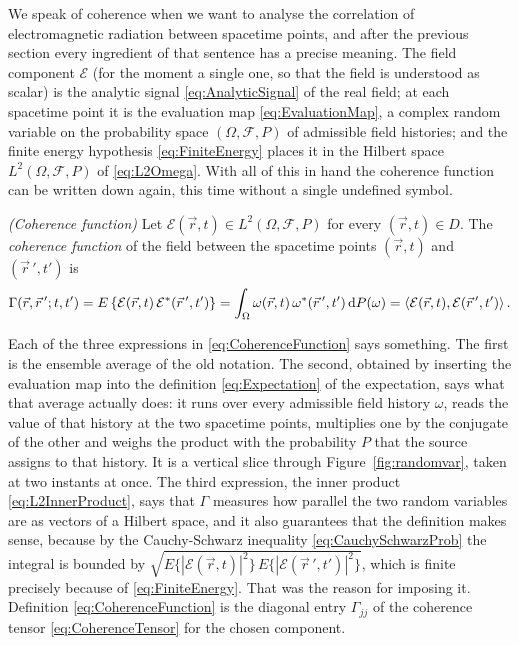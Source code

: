 	We speak of coherence when we want to analyse the correlation of electromagnetic radiation
	between spacetime points, and after the previous section every ingredient of that
	sentence has a precise meaning. The field component $\mathcal{E}$ (for the moment a
	single one, so that the field is understood as scalar) is the analytic signal
	\eqref{eq:AnalyticSignal} of the real field; at each spacetime point it is the evaluation
	map \eqref{eq:EvaluationMap}, a complex random variable on the probability space
	$(\Omega,\mathcal{F},P)$ of admissible field histories; and the finite energy hypothesis
	\eqref{eq:FiniteEnergy} places it in the Hilbert space $L^{2}(\Omega,\mathcal{F},P)$ of
	\eqref{eq:L2Omega}. With all of this in hand the coherence function can be written down
	again, this time without a single undefined symbol.

	\begin{myDef}
		\textit{(Coherence function)} Let $\mathcal{E}(\vec{r},t)\in L^{2}(\Omega,\mathcal{F},P)$
		for every $(\vec{r},t)\in D$. The \emph{coherence function} of the field between the
		spacetime points $(\vec{r},t)$ and $(\vec{r}\,',t')$ is
		\begin{equation}\label{eq:CoherenceFunction}
			\Gamma(\vec{r},\vec{r}\,';t,t') = E\left\{\mathcal{E}(\vec{r},t)\,\mathcal{E}^{*}(\vec{r}\,',t')\right\}
			= \int_{\Omega}\omega(\vec{r},t)\,\omega^{*}(\vec{r}\,',t')\,\mathrm{d}P(\omega)
			= \braket{\mathcal{E}(\vec{r},t),\mathcal{E}(\vec{r}\,',t')}.
		\end{equation}
	\end{myDef}

	Each of the three expressions in \eqref{eq:CoherenceFunction} says something. The first is
	the ensemble average of the old notation. The second, obtained by inserting the
	evaluation map into the definition \eqref{eq:Expectation} of the expectation, says what
	that average actually does: it runs over every admissible field history $\omega$, reads
	the value of that history at the two spacetime points, multiplies one by the conjugate of
	the other and weighs the product with the probability $P$ that the source assigns to that
	history. It is a vertical slice through Figure~\ref{fig:randomvar}, taken at two instants
	at once. The third expression, the inner product \eqref{eq:L2InnerProduct}, says that
	$\Gamma$ measures how parallel the two random variables are as vectors of a Hilbert
	space, and it also guarantees that the definition makes sense, because by the
	Cauchy-Schwarz inequality \eqref{eq:CauchySchwarzProb} the integral is bounded by
	$\sqrt{E\{|\mathcal{E}(\vec{r},t)|^{2}\}\,E\{|\mathcal{E}(\vec{r}\,',t')|^{2}\}}$, which is
	finite precisely because of \eqref{eq:FiniteEnergy}. That was the reason for imposing it.
	Definition \eqref{eq:CoherenceFunction} is the diagonal entry $\Gamma_{jj}$ of the
	coherence tensor \eqref{eq:CoherenceTensor} for the chosen component.

